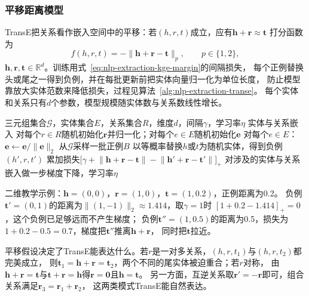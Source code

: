 \subsubsection{平移距离模型}
\label{sec:nlp-extraction-translational}

TransE把关系看作嵌入空间中的平移：若$(h,r,t)$成立，应有$\bm{h}+\bm{r}\approx\bm{t}$
打分函数为
\begin{equation}
  f(h,r,t)=-\lVert\bm{h}+\bm{r}-\bm{t}\rVert_{p},\qquad p\in\{1,2\},
  \label{eq:nlp-extraction-transe}
\end{equation}
$\bm{h},\bm{r},\bm{t}\in\mathbb{R}^{d}$。训练用式~\eqref{eq:nlp-extraction-kge-margin}的间隔损失，
每个正例替换头或尾之一得到负例，并在每批更新前把实体向量归一化为单位长度，
防止模型靠放大实体范数来降低损失，过程见算法~\ref{alg:nlp-extraction-transe}。
每个实体和关系只有$d$个参数，模型规模随实体数与关系数线性增长。

\begin{algorithm}[TransE的随机梯度训练]
  \label{alg:nlp-extraction-transe}
  \begin{algorithmic}[1]
    \Require 三元组集合$\mathcal{G}$，实体集合$E$，关系集合$R$，维度$d$，间隔$\gamma$，学习率$\eta$
    \Ensure 实体与关系嵌入
    \State 对每个$r\in R$随机初始化$\bm{r}$并归一化；对每个$e\in E$随机初始化$\bm{e}$
    \Repeat
      \State 对每个$e\in E$：$\bm{e}\gets\bm{e}/\lVert\bm{e}\rVert_2$
      \State 从$\mathcal{G}$采样一批正例$B$
        \State 以等概率替换$h$或$t$为随机实体，得到负例$(h',r,t')$
        \State 累加损失$\bigl[\gamma+\lVert\bm{h}+\bm{r}-\bm{t}\rVert-\lVert\bm{h}'+\bm{r}-\bm{t}'\rVert\bigr]_+$
      \EndFor
      \State 对涉及的实体与关系嵌入做一步梯度下降，学习率$\eta$
  \end{algorithmic}
\end{algorithm}

二维教学示例：$\bm{h}=(0,0)$，$\bm{r}=(1,0)$，$\bm{t}=(1,0.2)$，正例距离为0.2。
负例$\bm{t}'=(0,1)$的距离为$\lVert(1,-1)\rVert_2\approx1.414$，取$\gamma=1$时
$[1+0.2-1.414]_+=0$，这个负例已足够远而不产生梯度；
负例$\bm{t}''=(1,0.5)$的距离为0.5，损失为$1+0.2-0.5=0.7$，梯度把$\bm{t}''$推离$\bm{h}+\bm{r}$，
同时把$\bm{t}$拉近。

平移假设决定了TransE能表达什么。若$r$是一对多关系，$(h,r,t_1)$与$(h,r,t_2)$都完美成立，
则$\bm{t}_1=\bm{h}+\bm{r}=\bm{t}_2$，两个不同的尾实体被迫重合；若$r$对称，
由$\bm{h}+\bm{r}=\bm{t}$与$\bm{t}+\bm{r}=\bm{h}$得$\bm{r}=\bm{0}$且$\bm{h}=\bm{t}$。
另一方面，互逆关系取$\bm{r}'=-\bm{r}$即可，组合关系满足$\bm{r}_3=\bm{r}_1+\bm{r}_2$，
这两类模式TransE能自然表达。

